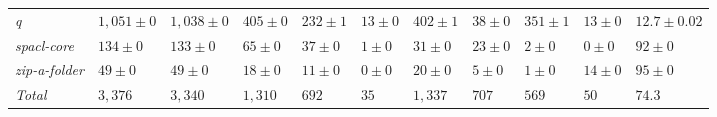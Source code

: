 \begin{table}
{\begin{tabular}[t]{lllllllllll}
\textit{q} & $1,051 \pm 0$ & $1,038 \pm 0$ & $405 \pm 0$ & $232 \pm 1$ & $13 \pm 0$ & $402 \pm 1$ & $38 \pm 0$ & $351 \pm 1$ & $13 \pm 0$ & $12.7 \pm 0.02$\\
\textit{spacl-core} & $134 \pm 0$ & $133 \pm 0$ & $65 \pm 0$ & $37 \pm 0$ & $1 \pm 0$ & $31 \pm 0$ & $23 \pm 0$ & $2 \pm 0$ & $0 \pm 0$ & $92 \pm 0$\\
\textit{zip-a-folder} & $49 \pm 0$ & $49 \pm 0$ & $18 \pm 0$ & $11 \pm 0$ & $0 \pm 0$ & $20 \pm 0$ & $5 \pm 0$ & $1 \pm 0$ & $14 \pm 0$ & $95 \pm 0$\\
\hline\textit{Total} & $3,376$ & $3,340$ & $1,310$ & $692$ & $35$ & $1,337$ & $707$ & $569$ & $50$ & $74.3$\\
\bottomrule
\end{tabular}}
\end{table}
